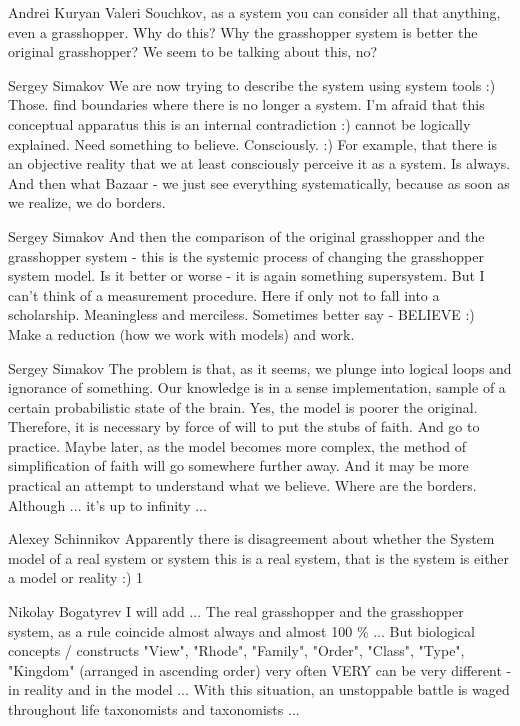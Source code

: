 \documentclass[11pt,a4paper]{article}
\begin{document}
Andrei Kuryan Valeri Souchkov, as a system you can consider all that anything,
even a grasshopper. Why do this? Why the grasshopper system is better the
original grasshopper? We seem to be talking about this, no?

Sergey Simakov We are now trying to describe the system using system tools :)
Those. find boundaries where there is no longer a system. I'm afraid that this
conceptual apparatus this is an internal contradiction :) cannot be logically
explained. Need something to believe. Consciously. :) For example, that there
is an objective reality that we at least consciously perceive it as a
system. Is always. And then what Bazaar - we just see everything
systematically, because as soon as we realize, we do borders.

Sergey Simakov And then the comparison of the original grasshopper and the
grasshopper system - this is the systemic process of changing the grasshopper
system model. Is it better or worse - it is again something supersystem. But I
can’t think of a measurement procedure. Here if only not to fall into a
scholarship. Meaningless and merciless. Sometimes better say - BELIEVE :) Make
a reduction (how we work with models) and work.

Sergey Simakov The problem is that, as it seems, we plunge into logical loops
and ignorance of something. Our knowledge is in a sense implementation, sample
of a certain probabilistic state of the brain. Yes, the model is poorer the
original. Therefore, it is necessary by force of will to put the stubs of
faith. And go to practice. Maybe later, as the model becomes more complex, the
method of simplification of faith will go somewhere further away. And it may
be more practical an attempt to understand what we believe. Where are the
borders. Although ... it's up to infinity ...

Alexey Schinnikov Apparently there is disagreement about whether the System
model of a real system or system this is a real system, that is the system is
either a model or reality :) 1

Nikolay Bogatyrev I will add ... The real grasshopper and the grasshopper
system, as a rule coincide almost always and almost 100 \% ... But biological
concepts / constructs "View", "Rhode", "Family", "Order", "Class", "Type",
"Kingdom" (arranged in ascending order) very often VERY can be very different
- in reality and in the model ... With this situation, an unstoppable battle
is waged throughout life taxonomists and taxonomists ...
\end{document}
